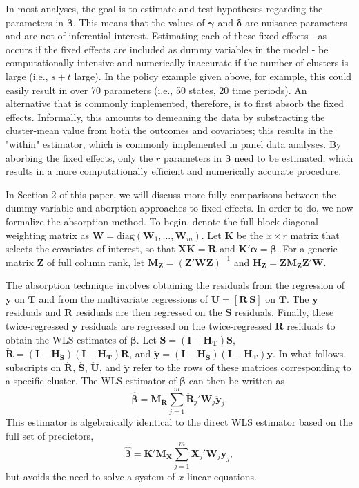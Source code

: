 \documentclass[12pt]{article}
\newcommand{\bm}{\mathbf}
\newcommand{\bs}{\boldsymbol}
\begin{document}
In most analyses, the goal is to estimate and test hypotheses regarding the parameters in $\bs\beta$. 
This means that the values of $\bs\gamma$ and $\bs\delta$ are nuisance parameters and are not of inferential interest. 
Estimating each of these fixed effects - as occurs if the fixed effects are included as dummy variables in the model - be computationally intensive and numerically inaccurate if the number of clusters is large (i.e., $s + t$ large). 
In the policy example given above, for example, this could easily result in over 70 parameters (i.e., 50 states, 20 time periods).
An alternative that is commonly implemented, therefore, is to first absorb the fixed effects. 
Informally, this amounts to demeaning the data by substracting the cluster-mean value from both the outcomes and covariates; this results in the "within" estimator, which is commonly implemented in panel data analyses. 
By aborbing the fixed effects, only the $r$ parameters in $\bs\beta$ need to be estimated, which results in a more computationally efficient and numerically accurate procedure. 

In Section 2 of this paper, we will discuss more fully comparisons between the dummy variable and aborption approaches to fixed effects. 
In order to do, we now formalize the absorption method.
To begin, denote the full block-diagonal weighting matrix as $\bm{W} = \text{diag}\left(\bm{W}_1,...,\bm{W}_m\right)$.
Let $\bm{K}$ be the $x \times r$ matrix that selects the covariates of interest, so that $\bm{X} \bm{K} = \bm{R}$ and $\bm{K}'\bs\alpha = \bs\beta$.
For a generic matrix $\bm{Z}$ of full column rank, let $\bm{M_Z} = \left(\bm{Z}'\bm{W}\bm{Z}\right)^{-1}$ and $\bm{H_Z} = \bm{Z}\bm{M_Z}\bm{Z}'\bm{W}$. 

The absorption technique involves obtaining the residuals from the regression of $\bm{y}$ on $\bm{T}$ and from the multivariate regressions of $\bm{U} = [\bm{R}\ \bm{S}]$ on $\bm{T}$. 
The $\bm{y}$ residuals and $\bm{R}$ residuals are then regressed on the $\bm{S}$ residuals. 
Finally, these twice-regressed $\bm{y}$ residuals are regressed on the twice-regressed $\bm{R}$ residuals to obtain the WLS estimates of $\bs\beta$. 
Let $\bm{\ddot{S}} = \left(\bm{I} - \bm{H_T}\right)\bm{S}$, $\bm{\ddot{R}} = \left(\bm{I} - \bm{H_{\ddot{S}}}\right)\left(\bm{I} - \bm{H_T}\right)\bm{R}$, and $\bm{\ddot{y}} = \left(\bm{I} - \bm{H_{\ddot{S}}}\right)\left(\bm{I} - \bm{H_T}\right)\bm{y}$. 
In what follows, subscripts on $\bm{\ddot{R}}$, $\bm{\ddot{S}}$,  $\bm{\ddot{U}}$, and $\bm{\ddot{y}}$ refer to the rows of these matrices corresponding to a specific cluster. 
The WLS estimator of $\bs\beta$ can then be written as
\begin{equation}
\label{eq:WLS}
\bs{\hat\beta} = \bm{M_{\ddot{R}}} \sum_{j=1}^m \bm{\ddot{R}}_j' \bm{W}_j \bm{\ddot{y}}_j. 
\end{equation}
This estimator is algebraically identical to the direct WLS estimator based on the full set of predictors, \[
\bs{\hat\beta} = \bm{K}'\bm{M_X} \sum_{j=1}^m \bm{X}_j' \bm{W}_j \bm{y}_j,
\]
but avoids the need to solve a system of $x$ linear equations.
\end{document}

